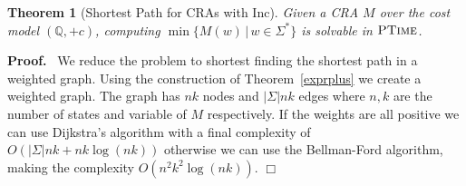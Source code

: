 \documentclass[11pt]{article}
\newtheorem{theorem}{Theorem}
\def\Proof{{\bf Proof.}}
\def\qed{{\bf $\Box$}}
\def\bigO{{O}}
\def\qed{{\bf $\Box$}}
\newcommand{\Rat}{\ensuremath{\mathbb{Q}}}
\newcommand{\sep}{\ensuremath{\,|\,}}
\newcommand{\fm}[1]{\ensuremath{#1^{*}}}
\newcommand{\ptime}{\ensuremath{\sc\textsc{PTime}}\xspace}
\newcommand{\edwa}{\ensuremath{M}}
\begin{document}
\begin{theorem}[Shortest Path for CRAs with Inc]\label{pEDWAmcp}
Given a CRA $\edwa$ over the cost model $(\Rat,+c)$, computing $\min\{\edwa(w)\sep w\in\fm\Sigma\}$
is solvable in $\ptime$.
\end{theorem}

\Proof~ We reduce the problem to shortest finding the shortest path in
a weighted graph. Using the construction of Theorem~\ref{exprplus} we
create a weighted graph. The graph has $nk$ nodes and
$|\Sigma|nk$ edges where $n,k$ are the number of states and variable of $\edwa$ respectively.  If the weights are all positive we can use
Dijkstra's algorithm with a final complexity of
$\bigO(|\Sigma|nk+nk \log(nk))$ otherwise we can use
the Bellman-Ford algorithm, making the complexity $\bigO(n^2k^2
\log(nk))$.  \qed \\
\end{document}
